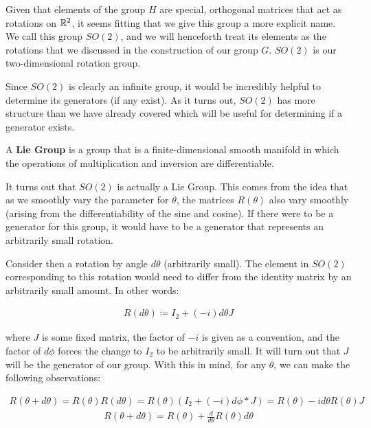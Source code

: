 Given that elements of the group $H$ are special, orthogonal matrices that act as rotations on $\mathbb{R}^2$, it seems fitting that we give this group a more explicit name. We call this group $SO(2)$, and we will henceforth treat its elements as the rotations that we discussed in the construction of our group $G$. $SO(2)$ is our two-dimensional rotation group.

Since $SO(2)$ is clearly an infinite group, it would be incredibly helpful to determine its generators (if any exist). As it turns out, $SO(2)$ has more structure than we have already covered which will be useful for determining if a generator exists.

\begin{definition}
	A \textbf{Lie Group} is a group that is a finite-dimensional smooth manifold in which the operations of multiplication and inversion are differentiable.
\end{definition}

It turns out that $SO(2)$ is actually a Lie Group. This comes from the idea that as we smoothly vary the parameter for $\theta$, the matrices $R(\theta)$ also vary smoothly (arising from the differentiability of the sine and cosine). If there were to be a generator for this group, it would have to be a generator that represents an arbitrarily small rotation.

Consider then a rotation by angle $d\theta$ (arbitrarily small). The element in $SO(2)$ corresponding to this rotation would need to differ from the identity matrix by an arbitrarily small amount. In other words:

\begin{equation}
	\begin{aligned}
		R(d\theta) \coloneq I_2 + (-i)d\theta  J
	\end{aligned}
\end{equation}  

\noindent where $J$ is some fixed matrix, the factor of $-i$ is given as a convention, and the factor of $d\phi$ forces the change to $I_2$ to be arbitrarily small. It will turn out that $J$ will be the generator of our group. With this in mind, for any $\theta$, we can make the following observations:

\begin{equation}
	\begin{aligned}
		R(\theta + d\theta) = R(\theta)R(d\theta) = R(\theta)\left(I_2 + (-i)d\phi * J\right) = R(\theta) - id\theta R(\theta)J
	\end{aligned}
\end{equation}  
\begin{equation}
	\begin{aligned}
		R(\theta + d\theta) = R(\theta) + \frac{d}{d\theta}R(\theta)d\theta
	\end{aligned}
\end{equation}  

